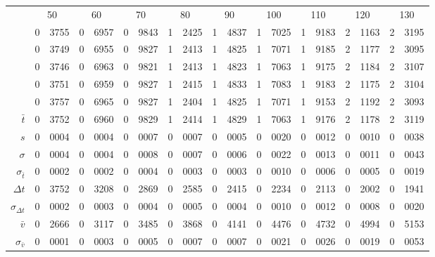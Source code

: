\begin{tabular}{r *9{r@{.}l}}
 &\multicolumn{2}{c}{50}
&\multicolumn{2}{c}{60}
&\multicolumn{2}{c}{70}
&\multicolumn{2}{c}{80}
&\multicolumn{2}{c}{90}
&\multicolumn{2}{c}{100}
&\multicolumn{2}{c}{110}
&\multicolumn{2}{c}{120}
&\multicolumn{2}{c}{130}\\[3 pt]
   &0&3755 &0&6957 &0&9843 &1&2425 &1&4837 &1&7025 &1&9183 &2&1163 &2&3195\\
   &0&3749 &0&6955 &0&9827 &1&2413 &1&4825 &1&7071 &1&9185 &2&1177 &2&3095\\
   &0&3746 &0&6963 &0&9821 &1&2413 &1&4823 &1&7063 &1&9175 &2&1184 &2&3107\\
   &0&3751 &0&6959 &0&9827 &1&2415 &1&4833 &1&7083 &1&9183 &2&1175 &2&3104\\
   &0&3757 &0&6965 &0&9827 &1&2404 &1&4825 &1&7071 &1&9153 &2&1192 &2&3093\\[3 pt]
$\bar{t}$ &0&3752 &0&6960 &0&9829 &1&2414 &1&4829 &1&7063 &1&9176 &2&1178 &2&3119\\
$s$ &0&0004 &0&0004 &0&0007 &0&0007 &0&0005 &0&0020 &0&0012 &0&0010 &0&0038\\
$\sigma$ &0&0004 &0&0004 &0&0008 &0&0007 &0&0006 &0&0022 &0&0013 &0&0011 &0&0043\\
$\sigma_{\bar{t}}$ &0&0002 &0&0002 &0&0004 &0&0003 &0&0003 &0&0010 &0&0006 &0&0005 &0&0019\\[3 pt]
$\Delta t$ &0&3752 &0&3208 &0&2869 &0&2585 &0&2415 &0&2234 &0&2113 &0&2002 &0&1941\\
$\sigma_{\Delta t}$ &0&0002 &0&0003 &0&0004 &0&0005 &0&0004 &0&0010 &0&0012 &0&0008 &0&0020\\
$\bar{v}$ &0&2666 &0&3117 &0&3485 &0&3868 &0&4141 &0&4476 &0&4732 &0&4994 &0&5153\\
$\sigma_{\bar{v}}$ &0&0001 &0&0003 &0&0005 &0&0007 &0&0007 &0&0021 &0&0026 &0&0019 &0&0053
\end{tabular}